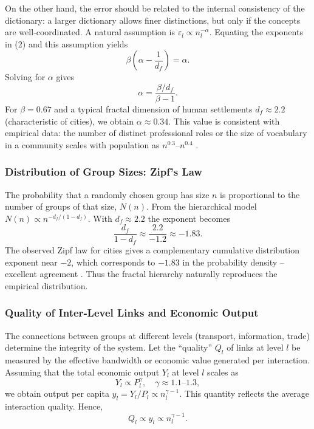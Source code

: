 \documentclass[11pt]{article}
\theoremstyle{remark}
\begin{document}
	On the other hand, the error should be related to the internal consistency of the dictionary: a larger dictionary allows finer distinctions, but only if the concepts are well‑coordinated. A natural assumption is \(\varepsilon_l \propto n_l^{-\alpha}\). Equating the exponents in (2) and this assumption yields
	\[
	\beta\left(\alpha - \frac{1}{d_f}\right) = \alpha.
	\]
	Solving for \(\alpha\) gives
	\[
	\alpha = \frac{\beta / d_f}{\beta - 1}. \tag{3}
	\]
	For \(\beta = 0.67\) and a typical fractal dimension of human settlements \(d_f \approx 2.2\) (characteristic of cities), we obtain \(\alpha \approx 0.34\). This value is consistent with empirical data: the number of distinct professional roles or the size of vocabulary in a community scales with population as \(n^{0.3}\)–\(n^{0.4}\) \cite{Bettencourt2007, Molinero2024}.
	
	\subsubsection{Distribution of Group Sizes: Zipf's Law}
	The probability that a randomly chosen group has size \(n\) is proportional to the number of groups of that size, \(N(n)\). From the hierarchical model \(N(n) \propto n^{-d_f/(1-d_f)}\). With \(d_f \approx 2.2\) the exponent becomes
	\[
	\frac{d_f}{1-d_f} \approx \frac{2.2}{-1.2} \approx -1.83.
	\]
	The observed Zipf law for cities gives a complementary cumulative distribution exponent near \(-2\), which corresponds to \(-1.83\) in the probability density – excellent agreement \cite{Fluschnik2016, Rybski2023}. Thus the fractal hierarchy naturally reproduces the empirical distribution.
	
	\subsubsection{Quality of Inter‑Level Links and Economic Output}
	The connections between groups at different levels (transport, information, trade) determine the integrity of the system. Let the ``quality'' \(Q_l\) of links at level \(l\) be measured by the effective bandwidth or economic value generated per interaction. Assuming that the total economic output \(Y_l\) at level \(l\) scales as
	\[
	Y_l \propto P_l^{\gamma}, \quad \gamma \approx 1.1\text{--}1.3,
	\]
	we obtain output per capita \(y_l = Y_l / P_l \propto n_l^{\gamma-1}\). This quantity reflects the average interaction quality. Hence,
	\[
	Q_l \propto y_l \propto n_l^{\gamma-1}. \tag{4}
	\]
	
\end{document}
